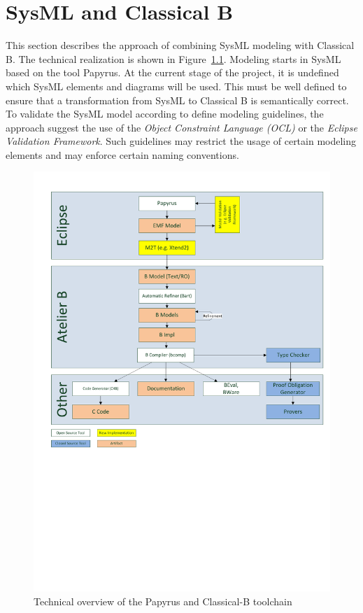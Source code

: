 \chapter{SysML and Classical B}
\label{sec:sysML-B}

This section describes the approach of combining SysML modeling with
Classical B. The technical realization is shown in Figure~\ref{fig:classical-b-toolchain}.
Modeling starts in SysML based on the
tool Papyrus. At the current stage of the project, it is undefined
which SysML elements and diagrams will be used. This must be well
defined to ensure that a transformation from SysML to Classical B is
semantically correct. To validate the SysML model according to define
modeling guidelines, the approach suggest the use of the \emph{Object
  Constraint Language (OCL)} or the \emph{Eclipse Validation
  Framework}. Such guidelines may restrict the usage of certain
modeling elements and may enforce certain naming conventions.

\begin{figure}[b!]
  \centering
  \includegraphics[width=6in]{images/classical_b_toolchain.pdf}
  \caption{Technical overview of the Papyrus and Classical-B toolchain}
  \label{fig:classical-b-toolchain}
\end{figure}

